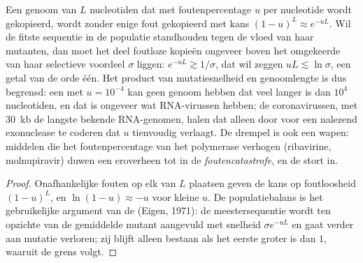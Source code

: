 \begin{proposition}[De foutendrempel]\label{prop:b3:virology:error-threshold}
Een genoom van $L$ nucleotiden dat met foutenpercentage $u$ per
nucleotide wordt gekopieerd, wordt zonder enige fout gekopieerd met
kans $(1-u)^{L} \approx e^{-uL}$. Wil de fitste sequentie in de
populatie standhouden tegen de vloed van haar mutanten, dan moet het
deel foutloze kopieën ongeveer boven het omgekeerde van haar selectieve
voordeel $\sigma$ liggen: $e^{-uL} \gtrsim
1/\sigma$, dat wil zeggen $uL \lesssim \ln\sigma$, een getal van de
orde één. Het product van mutatiesnelheid en genoomlengte is dus
begrensd: een  met $u = 10^{-4}$ kan geen genoom hebben dat
veel langer is dan $10^{4}$ nucleotiden, en dat is ongeveer wat
RNA-virussen hebben; de coronavirussen, met \qty{30}{kb} de langste
bekende RNA-genomen, halen dat alleen door voor een nalezend
exonuclease te coderen dat $u$ tienvoudig verlaagt. De drempel is ook
een wapen: middelen die het foutenpercentage van het polymerase
verhogen (ribavirine, molnupiravir) duwen een  eroverheen tot in
de \emph{foutencatastrofe}, en de  stort in.
\end{proposition}
\begin{proof}
Onafhankelijke fouten op elk van $L$ plaatsen geven de kans op
foutloosheid $(1-u)^{L}$, en $\ln(1-u) \approx -u$ voor kleine $u$. De
populatiebalans is het gebruikelijke argument van de  (Eigen,
1971): de meestersequentie wordt ten opzichte van de gemiddelde mutant
aangevuld met snelheid $\sigma e^{-uL}$ en gaat verder aan mutatie
verloren; zij blijft alleen bestaan als het eerste groter is dan $1$,
waaruit de grens volgt.
\end{proof}

